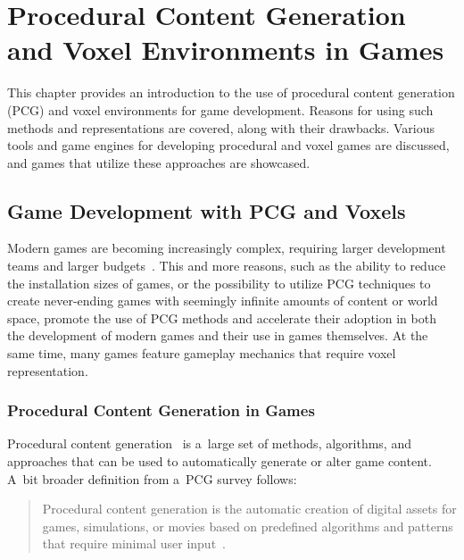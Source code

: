 \chapter{Procedural Content Generation and Voxel Environments in Games}\label{intro-game-dev-proc-gen}

This chapter provides an introduction to the use of procedural content generation (PCG) and voxel environments for game development. Reasons for using such methods and representations are covered, along with their drawbacks. Various tools and game engines for developing procedural and voxel games are discussed, and games that utilize these approaches are showcased.

\section{Game Development with PCG and Voxels}

Modern games are becoming increasingly complex, requiring larger development teams and larger budgets~\cite{proc_gen_survey_mdpi, procdural_generation_game_design_book, proc_gen_review}. This and more reasons, such as the ability to reduce the installation sizes of games, or the possibility to utilize PCG techniques to create never-ending games with seemingly infinite amounts of content or world space, promote the use of PCG methods and accelerate their adoption in both the development of modern games and their use in games themselves. At the same time, many games feature gameplay mechanics that require voxel representation.

\subsection{Procedural Content Generation in Games}

Procedural content generation~\cite{proc_gen_review, proc_gen_survey_mdpi, proc-cont-gen-games-survey-hendrikx, procdural_generation_game_design_book} is a~large set of methods, algorithms, and approaches that can be used to automatically generate or alter game content. A~bit broader definition from a~PCG survey follows:

\begin{quote}
    Procedural content generation is the automatic creation of digital assets for games, simulations, or movies based on predefined algorithms and patterns that require minimal user input~\cite{proc_gen_survey_mdpi}.
\end{quote}

